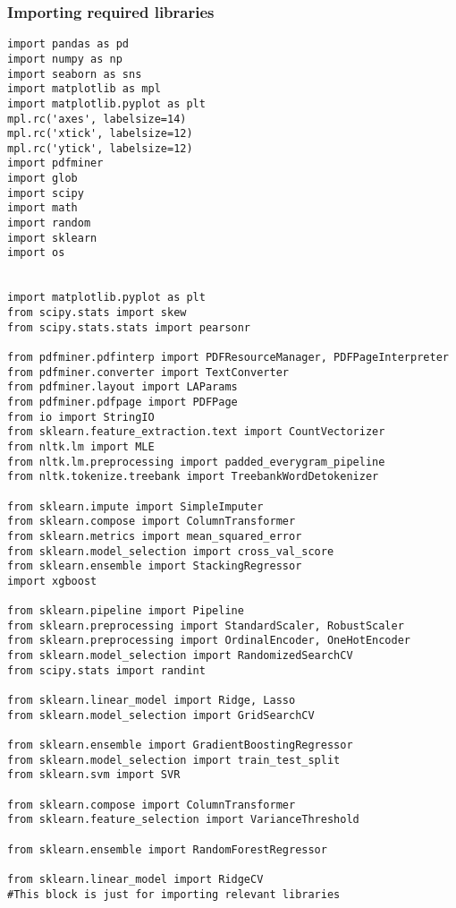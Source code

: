 \documentclass[12pt]{article}%
\begin{document}
\subsubsection*{Importing required libraries}
\begin{lstlisting}
import pandas as pd
import numpy as np
import seaborn as sns
import matplotlib as mpl
import matplotlib.pyplot as plt
mpl.rc('axes', labelsize=14)
mpl.rc('xtick', labelsize=12)
mpl.rc('ytick', labelsize=12)
import pdfminer
import glob
import scipy
import math
import random
import sklearn
import os


import matplotlib.pyplot as plt
from scipy.stats import skew
from scipy.stats.stats import pearsonr

from pdfminer.pdfinterp import PDFResourceManager, PDFPageInterpreter
from pdfminer.converter import TextConverter
from pdfminer.layout import LAParams
from pdfminer.pdfpage import PDFPage
from io import StringIO
from sklearn.feature_extraction.text import CountVectorizer
from nltk.lm import MLE
from nltk.lm.preprocessing import padded_everygram_pipeline
from nltk.tokenize.treebank import TreebankWordDetokenizer

from sklearn.impute import SimpleImputer
from sklearn.compose import ColumnTransformer
from sklearn.metrics import mean_squared_error
from sklearn.model_selection import cross_val_score
from sklearn.ensemble import StackingRegressor
import xgboost

from sklearn.pipeline import Pipeline
from sklearn.preprocessing import StandardScaler, RobustScaler
from sklearn.preprocessing import OrdinalEncoder, OneHotEncoder
from sklearn.model_selection import RandomizedSearchCV
from scipy.stats import randint

from sklearn.linear_model import Ridge, Lasso
from sklearn.model_selection import GridSearchCV

from sklearn.ensemble import GradientBoostingRegressor
from sklearn.model_selection import train_test_split
from sklearn.svm import SVR

from sklearn.compose import ColumnTransformer
from sklearn.feature_selection import VarianceThreshold

from sklearn.ensemble import RandomForestRegressor

from sklearn.linear_model import RidgeCV
#This block is just for importing relevant libraries
\end{lstlisting}
\end{document}
